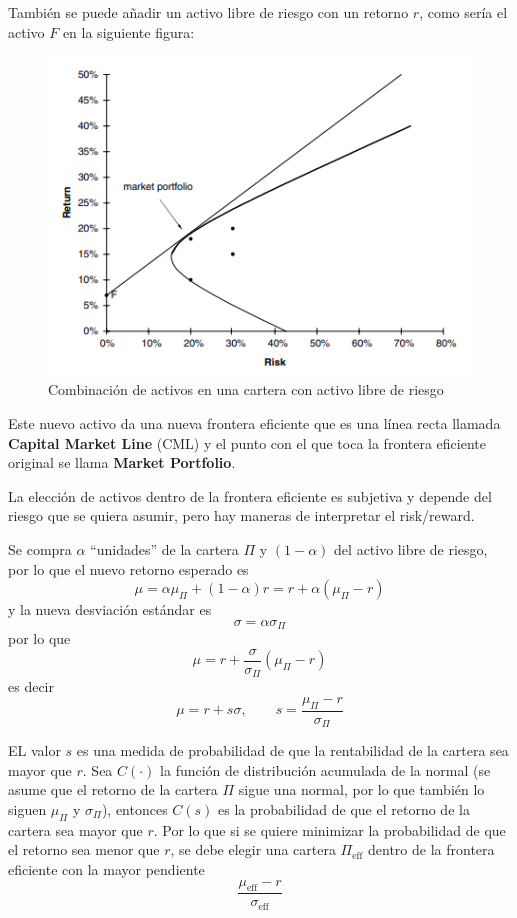 También se puede añadir un activo libre de riesgo con un retorno $r$, como sería el activo $F$ en la siguiente figura:
\begin{figure}[H]
    \centering
    \includegraphics[width=0.65\linewidth]{Imagenes/Parte1/14_Gestion_carteras/Combinacion_activos_Free_Risk.png}
    \caption{Combinación de activos en una cartera con activo libre de riesgo}
    \label{fig:cartera_free_risk}
\end{figure}
Este nuevo activo da una nueva frontera eficiente que es una línea recta llamada \textbf{Capital Market Line} (CML) y el punto con el que toca la frontera eficiente original se llama \textbf{Market Portfolio}.




La elección de activos dentro de la frontera eficiente es subjetiva y depende del riesgo que se quiera asumir, pero hay maneras de interpretar el risk/reward. 

Se compra $\alpha$ ``unidades'' de la cartera $\Pi$ y $(1-\alpha)$ del activo libre de riesgo, por lo que el nuevo retorno esperado es
\[
    \mu = \alpha \mu_{\Pi} + (1 - \alpha) r = r + \alpha \left( \mu_{\Pi} - r \right)
\]
y la nueva desviación estándar es
\[
    \sigma = \alpha \sigma_{\Pi}
\]
por lo que
\[
    \mu = r + \frac{\sigma}{\sigma_{\Pi}} \left( \mu_{\Pi} - r \right)
\]
es decir
\[
    \mu = r + s \sigma, \qquad \boxed{s = \frac{\mu_{\Pi} - r}{\sigma_{\Pi}}}
\]

EL valor $s$ es una medida de probabilidad de que la rentabilidad de la cartera sea mayor que $r$. Sea $C(\cdot)$ la función de distribución acumulada de la normal (se asume que el retorno de la cartera $\Pi$ sigue una normal, por lo que también lo siguen $\mu_{\Pi}$ y $\sigma_{\Pi}$), entonces $C(s)$ es la probabilidad de que el retorno de la cartera sea mayor que $r$. Por lo que si se quiere minimizar la probabilidad de que el retorno sea menor que $r$, se debe elegir una cartera $\Pi_{\text{eff}}$ dentro de la frontera eficiente con la mayor pendiente
\[
    \frac{\mu_{\text{eff}} -  r}{\sigma_{\text{eff}}}
\]


